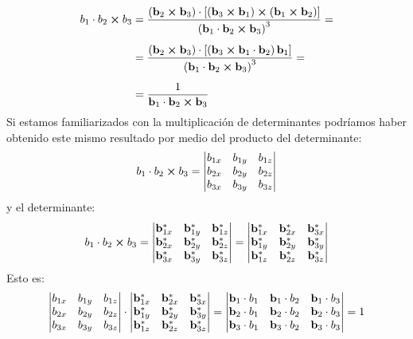 \begin{align}
\begin{aligned}
b_{1} \cdot b_{2} \cp b_{3} &= \dfrac{\left( \vb{b}_{2} \cp \vb{b}_{3} \right) \cdot \left[ \left( \vb{b}_{3} \cp \vb{b}_{1} \right) \cp \left( \vb{b}_{1} \cp \vb{b}_{2} \right) \right]}{\left( \vb{b}_{1} \cdot \vb{b}_{2} \cp \vb{b}_{3} \right)^{3}} = \\[0.5em]
 &= \dfrac{\left( \vb{b}_{2} \cp \vb{b}_{3} \right) \cdot \left[ \left( \vb{b}_{3} \cp \vb{b}_{1} \cdot \vb{b}_{2} \right) \vb{b}_{1} \right]}{\left( \vb{b}_{1} \cdot \vb{b}_{2} \cp \vb{b}_{3} \right)^{3}} = \\[0.5em]
&= \dfrac{1}{\vb{b}_{1} \cdot \vb{b}_{2} \cp \vb{b}_{3}}
\end{aligned}
\label{eq:ecuacion_01_41}
\end{align}
Si estamos familiarizados con la multiplicación de determinantes podríamos haber obtenido este mismo resultado por medio del producto del determinante:
\begin{align*}
b_{1} \cdot b_{2} \cp b_{3} = \mdet{
    b_{1x} & b_{1y} & b_{1z} \\
    b_{2x} & b_{2y} & b_{2z} \\
    b_{3x} & b_{3y} & b_{3z}}
\end{align*}
y el determinante:
\begin{align*}
b_{1} \cdot b_{2} \cp b_{3} =
    \mdet{
    \vb{b}_{1x}^{*} & \vb{b}_{1y}^{*} & \vb{b}_{1z}^{*} \\
    \vb{b}_{2x}^{*} & \vb{b}_{2y}^{*} & \vb{b}_{2z}^{*} \\
    \vb{b}_{3x}^{*} & \vb{b}_{3y}^{*} & \vb{b}_{3z}^{*}
    } = 
    \mdet{
        \vb{b}_{1x}^{*} & \vb{b}_{2x}^{*} & \vb{b}_{3x}^{*} \\
        \vb{b}_{1y}^{*} & \vb{b}_{2y}^{*} & \vb{b}_{3y}^{*} \\
        \vb{b}_{1z}^{*} & \vb{b}_{2z}^{*} & \vb{b}_{3z}^{*}
    }
\end{align*}
Esto es:
\begin{align*}
    \mdet{
        b_{1x} & b_{1y} & b_{1z} \\
        b_{2x} & b_{2y} & b_{2z} \\
        b_{3x} & b_{3y} & b_{3z}
    } \cdot
    \mdet{
        \vb{b}_{1x}^{*} & \vb{b}_{2x}^{*} & \vb{b}_{3x}^{*} \\
        \vb{b}_{1y}^{*} & \vb{b}_{2y}^{*} & \vb{b}_{3y}^{*} \\
        \vb{b}_{1z}^{*} & \vb{b}_{2z}^{*} & \vb{b}_{3z}^{*}
    } = \mdet{
        \vb{b}_{1} \cdot b_{1} & \vb{b}_{1} \cdot b_{2} & \vb{b}_{1} \cdot b_{3} \\
        \vb{b}_{2} \cdot b_{1} & \vb{b}_{2} \cdot b_{2} & \vb{b}_{2} \cdot b_{3} \\
        \vb{b}_{3} \cdot b_{1} & \vb{b}_{3} \cdot b_{2} & \vb{b}_{3} \cdot b_{3}
    } = 1
\end{align*}

